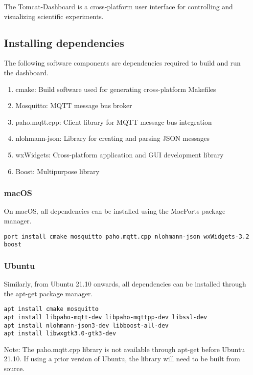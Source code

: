 The Tomcat-Dashboard is a cross-platform user interface for controlling and
visualizing scientific experiments.

\subsection{Installing dependencies}

The following software components are  dependencies required to build and run the dashboard.

\begin{enumerate}
    \item cmake: Build software used for generating cross-platform Makefiles
    \item Mosquitto: MQTT message bus broker
    \item paho.mqtt.cpp: Client library for MQTT message bus integration
    \item nlohmann-json:  Library for creating and parsing JSON messages
    \item wxWidgets: Cross-platform application and GUI development library
    \item Boost: Multipurpose library
\end{enumerate}

\subsubsection{macOS}

On macOS, all dependencies can be installed using the MacPorts package manager.

\begin{verbatim}
port install cmake mosquitto paho.mqtt.cpp nlohmann-json wxWidgets-3.2 boost
\end{verbatim}

\subsubsection{Ubuntu}

Similarly, from Ubuntu 21.10 onwards, all dependencies can be installed through
the apt-get package manager.

\begin{verbatim}
apt install cmake mosquitto
apt install libpaho-mqtt-dev libpaho-mqttpp-dev libssl-dev
apt install nlohmann-json3-dev libboost-all-dev
apt install libwxgtk3.0-gtk3-dev
\end{verbatim}

Note: The paho.mqtt.cpp library  is not available through  apt-get before
Ubuntu 21.10. If using a prior version of Ubuntu, the library will need to be
built from source.

